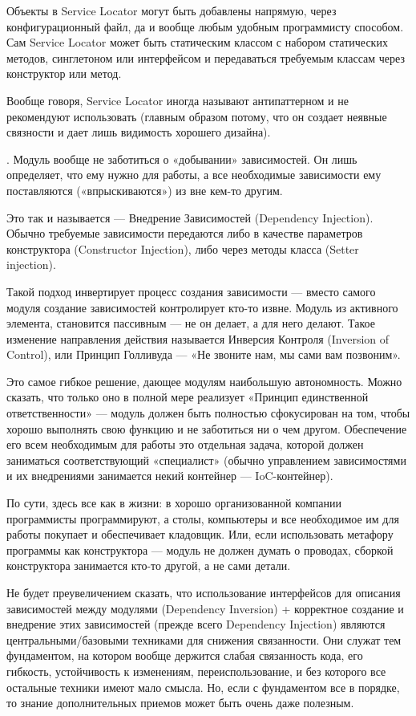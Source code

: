 \documentclass[a4paper]{article}
\begin{document}
Объекты в Service Locator могут быть добавлены напрямую, через конфигурационный файл, да и вообще любым удобным программисту способом. Сам Service Locator может быть статическим классом с набором статических методов, синглетоном или интерфейсом и передаваться требуемым классам через конструктор или метод.

Вообще говоря, Service Locator иногда называют антипаттерном и не рекомендуют использовать (главным образом потому, что он создает неявные связности и дает лишь видимость хорошего дизайна).

. Модуль вообще не заботиться о «добывании» зависимостей. Он лишь определяет, что ему нужно для работы, а все необходимые зависимости ему поставляются («впрыскиваются») из вне кем-то другим.

Это так и называется — Внедрение Зависимостей (Dependency Injection). Обычно требуемые зависимости передаются либо в качестве параметров конструктора (Constructor Injection), либо через методы класса (Setter injection).

Такой подход инвертирует процесс создания зависимости — вместо самого модуля создание зависимостей контролирует кто-то извне. Модуль из активного элемента, становится пассивным — не он делает, а для него делают. Такое изменение направления действия называется Инверсия Контроля (Inversion of Control), или Принцип Голливуда — «Не звоните нам, мы сами вам позвоним».

Это самое гибкое решение, дающее модулям наибольшую автономность. Можно сказать, что только оно в полной мере реализует «Принцип единственной ответственности» — модуль должен быть полностью сфокусирован на том, чтобы хорошо выполнять свою функцию и не заботиться ни о чем другом. Обеспечение его всем необходимым для работы это отдельная задача, которой должен заниматься соответствующий «специалист» (обычно управлением зависимостями и их внедрениями занимается некий контейнер — IoC-контейнер).

По сути, здесь все как в жизни: в хорошо организованной компании программисты программируют, а столы, компьютеры и все необходимое им для работы покупает и обеспечивает кладовщик. Или, если использовать метафору программы как конструктора — модуль не должен думать о проводах, сборкой конструктора занимается кто-то другой, а не сами детали.

Не будет преувеличением сказать, что использование интерфейсов для описания зависимостей между модулями (Dependency Inversion) + корректное создание и внедрение этих зависимостей (прежде всего Dependency Injection) являются центральными/базовыми техниками для снижения связанности. Они служат тем фундаментом, на котором вообще держится слабая связанность кода, его гибкость, устойчивость к изменениям, переиспользование, и без которого все остальные техники имеют мало смысла. Но, если с фундаментом все в порядке, то знание дополнительных приемов может быть очень даже полезным.
\end{document}
